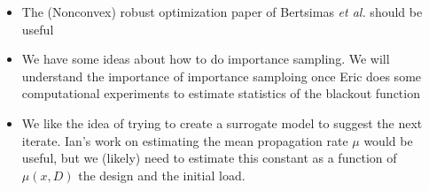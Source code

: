 \begin{itemize}
\item The (Nonconvex) robust optimization paper of Bertsimas {\it et
  al.} should be useful
\item We have some ideas about how to do importance sampling.  We will
  understand the importance of importance samploing once Eric does
  some computational experiments to estimate statistics of the
  blackout function
\item We like the idea of trying to create a surrogate model to
  suggest the next iterate.  Ian's work on estimating the mean
  propagation rate $\mu$ would be useful, but we (likely) need to
  estimate this constant as a function of $\mu(x,D)$ the design and
  the initial load.
\end{itemize}




